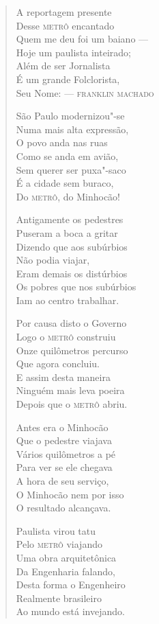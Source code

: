\begin{verse}
A reportagem presente \\
Desse \textsc{metrô} encantado \\
Quem me deu foi um baiano --- \\
Hoje um paulista inteirado; \\
Além de ser Jornalista \\
É um grande Folclorista, \\
Seu Nome: ---  \textsc{franklin machado}

São Paulo modernizou"-se \\
Numa mais alta expressão, \\
O povo anda nas ruas \\
Como se anda em avião, \\
Sem querer ser puxa"-saco \\
É a cidade sem buraco, \\
Do \textsc{metrô}, do Minhocão! 

Antigamente os pedestres \\
Puseram a boca a gritar \\
Dizendo que aos subúrbios \\
Não podia viajar, \\
Eram demais os distúrbios \\
Os pobres que nos subúrbios \\
Iam ao centro trabalhar. 


Por causa disto o Governo \\
Logo o \textsc{metrô} construiu \\
Onze quilômetros percurso \\
Que agora concluiu. \\
E assim desta maneira \\
Ninguém mais leva poeira \\
Depois que o \textsc{metrô} abriu. 

Antes era o Minhocão \\
Que o pedestre viajava \\
Vários quilômetros a pé \\
Para ver se ele chegava \\
A hora de seu serviço, \\
O Minhocão nem por isso \\
O resultado alcançava. 

Paulista virou tatu \\
Pelo \textsc{metrô} viajando \\
Uma obra arquitetônica \\
Da Engenharia falando, \\
Desta forma o Engenheiro \\
Realmente brasileiro \\
Ao mundo está invejando. 


\end{verse}
